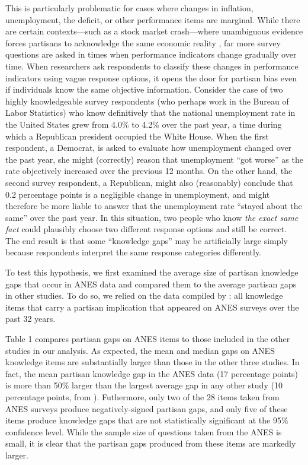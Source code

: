 \documentclass[12pt, letterpaper]{article}
\begin{document}
This is particularly problematic for cases where changes in inflation, unemployment, the deficit, or other performance items are marginal. While there are certain contexts---such as a stock market crash---where unambiguous evidence forces partisans to acknowledge the same economic reality \citep[e.g.][]{bisgaard2015bias,parkerstephen_2013}, far more survey questions are asked in times when performance indicators change gradually over time. When researchers ask respondents to classify these changes in performance indicators using vague response options, it opens the door for partisan bias even if individuals know the same objective information. Consider the case of two highly knowledgeable survey respondents (who perhaps work in the Bureau of Labor Statistics) who know definitively that the national unemployment rate in the United States grew from 4.0\% to 4.2\% over the past year, a time during which a Republican president occupied the White House. When the first respondent, a Democrat, is asked to evaluate how unemployment changed over the past year, she might (correctly) reason that unemployment ``got worse'' as the rate objectively increased over the previous 12 months. On the other hand, the second survey respondent, a Republican, might also (reasonably) conclude that 0.2 percentage points is a negligible change in unemployment, and might therefore be more liable to answer that the unemployment rate  ``stayed about the same'' over the past year. In this situation, two people who know \textit{the exact same fact} could plausibly choose two different response options and still be correct. The end result is that some ``knowledge gaps'' may be artificially large simply because respondents interpret the same response categories differently. 

To test this hypothesis, we first examined the average size of partisan knowledge gaps that occur in ANES data and compared them to the average partisan gaps in other studies. To do so, we relied on the data compiled by \citet{roush_2021}: all knowledge items that carry a partisan implication that appeared on ANES surveys over the past 32 years. 

Table 1 compares partisan gaps on ANES items to those included in the other studies in our analysis. As expected, the mean and median gaps on ANES knowledge items are substantially larger than those in the other three studies. In fact, the mean partisan knowledge gap in the ANES data (17 percentage points) is more than 50\% larger than the largest average gap in any other study (10 percentage points, from \citet{bullocketal_2015}). Futhermore, only two of the 28 items taken from ANES surveys produce negatively-signed partisan gaps, and only five of these items produce knowledge gaps that are not statistically significant at the 95\% confidence level. While the sample size of questions taken from the ANES is small, it is clear that the partisan gaps produced from these items are markedly larger.
\end{document}
